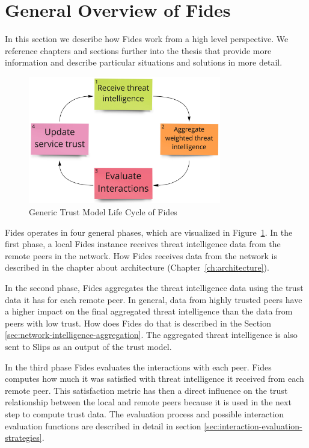 \section{General Overview of Fides}
\label{sec:general-overview-of-fides}
In this section we describe how Fides work from a high level perspective. We reference chapters and sections further into the thesis that provide more information and describe particular situations and solutions in more detail.

\begin{figure}[ht!]
    \centering
    \includegraphics[width=0.75\textwidth]{assets/fides_lifecycle.jpeg}
    \caption{Generic Trust Model Life Cycle of Fides}
    \label{fig:trust-model-life-cycle}
\end{figure}

Fides operates in four general phases, which are visualized in Figure~\ref{fig:trust-model-life-cycle}.
In the first phase, a local Fides instance receives threat intelligence data from the remote peers in the network. 
How Fides receives data from the network is described in the chapter about architecture (Chapter~\ref{ch:architecture}).

In the second phase, Fides aggregates the threat intelligence data using the trust data it has for each remote peer.
In general, data from highly trusted peers have a higher impact on the final aggregated threat intelligence than the data from peers with low trust.
How does Fides do that is described in the Section~ \ref{sec:network-intelligence-aggregation}.
The aggregated threat intelligence is also sent to Slips as an output of the trust model.

In the third phase Fides evaluates the interactions with each peer.
Fides computes how much it was satisfied with threat intelligence it received from each remote peer.
This satisfaction metric has then a direct influence on the trust relationship between the local and remote peers because it is used in the next step to compute trust data. 
The evaluation process and possible interaction evaluation functions are described in detail in section \ref{sec:interaction-evaluation-strategies}.

